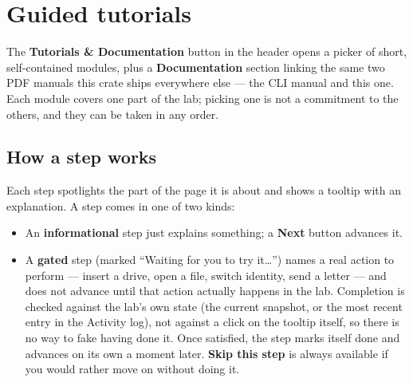 \section{Guided tutorials}

The \textbf{Tutorials \& Documentation} button in the header opens a
picker of short, self-contained modules, plus a \textbf{Documentation}
section linking the same two PDF manuals this crate ships everywhere else
--- the CLI manual and this one. Each module covers one part of the lab;
picking one is not a commitment to the others, and they can be taken in
any order.




\subsection{How a step works}

Each step spotlights the part of the page it is about and shows a tooltip
with an explanation. A step comes in one of two kinds:

\begin{itemize}
  \item An \textbf{informational} step just explains something; a
  \textbf{Next} button advances it.
  \item A \textbf{gated} step (marked ``Waiting for you to try it\ldots'')
  names a real action to perform --- insert a drive, open a file, switch
  identity, send a letter --- and does not advance until that action
  actually happens in the lab. Completion is checked against the lab's own
  state (the current snapshot, or the most recent entry in the Activity
  log), not against a click on the tooltip itself, so there is no way to
  fake having done it. Once satisfied, the step marks itself done and
  advances on its own a moment later. \textbf{Skip this step} is always
  available if you would rather move on without doing it.
\end{itemize}

